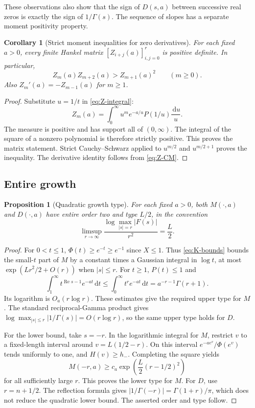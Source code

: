 \documentclass[11pt,a4paper]{article}
\numberwithin{equation}{section}
\newtheorem{proposition}[proposition]{Proposition}
\newtheorem{corollary}[corollary]{Corollary}
\theoremstyle{definition}
\theoremstyle{remark}
\newcommand{\dd}{\,\mathrm d}
\newcommand{\Rea}{\operatorname{Re}}
\newcommand{\abs}[1]{\left|#1\right|}
\begin{document}
These observations also show that the sign of $D(s,a)$ between
successive real zeros is exactly the sign of $1/\Gamma(s)$.
The sequence of slopes has a separate moment positivity property.

\begin{corollary}[Strict moment inequalities for zero derivatives]
\label{cor:Z-Hankel}
For each fixed $a>0$, every finite Hankel matrix
$[Z_{i+j}(a)]_{i,j=0}^{r}$ is positive definite. In particular,
\begin{equation}
 Z_m(a)Z_{m+2}(a)>Z_{m+1}(a)^2\qquad(m\ge0).
 \label{eq:Z-logconvex}
\end{equation}
Also $Z_m'(a)=-Z_{m-1}(a)$ for $m\ge1$.
\end{corollary}
\begin{proof}
Substitute $u=1/t$ in \cref{eq:Z-integral}:
\[
 Z_m(a)=\int_0^\infty u^m e^{-a/u}P(1/u)\frac{\dd u}{u}.
\]
The measure is positive and has support all of $(0,\infty)$.
The integral of the square of a nonzero polynomial is therefore
strictly positive. This proves the matrix statement. Strict
Cauchy--Schwarz applied to $u^{m/2}$ and $u^{m/2+1}$ proves the
inequality. The derivative identity follows from
\cref{eq:Z-CM}.
\end{proof}

\subsection{Entire growth}
\begin{proposition}[Quadratic growth type]
\label{prop:growth}
For each fixed $a>0$, both $M(\cdot,a)$ and $D(\cdot,a)$ have entire
order two and type $L/2$, in the convention
\[
 \limsup_{r\to\infty}\frac{\log\max_{\abs s=r}\abs{F(s)}}{r^2}
 =\frac L2.
\]
\end{proposition}
\begin{proof}
For $0<t\le1$, $\Phi(t)\ge e^{-t}\ge e^{-1}$ since $X\le1$.
Thus \cref{eq:K-bounds} bounds the small-$t$ part of $M$ by a
constant times a Gaussian integral in $\log t$, at most
$\exp(Lr^2/2+O(r))$ when $\abs s\le r$.
For $t\ge1$, $P(t)\le1$ and
\[
 \int_1^\infty t^{\Rea s-1}e^{-at}\dd t
 \le\int_0^\infty t^r e^{-at}\dd t
 =a^{-r-1}\Gamma(r+1).
\]
Its logarithm is $O_a(r\log r)$. These estimates give the required
upper type for $M$. The standard reciprocal-Gamma product gives
$\log\max_{\abs s\le r}\abs{1/\Gamma(s)}=O(r\log r)$, so the same
upper type holds for $D$.

For the lower bound, take $s=-r$. In the logarithmic integral for
$M$, restrict $v$ to a fixed-length interval around
$v=L(1/2-r)$. On this interval $e^{-ae^v}/\Phi(e^v)$ tends uniformly
to one, and $H(v)\ge h_-$. Completing the square yields
\[
 M(-r,a)\ge c_a\exp\left(\frac L2(r-1/2)^2\right)
\]
for all sufficiently large $r$. This proves the lower type for $M$.
For $D$, use $r=n+1/2$. The reflection formula gives
$\abs{1/\Gamma(-r)}=\Gamma(1+r)/\pi$, which does not reduce the
quadratic lower bound. The asserted order and type follow.
\end{proof}
\end{document}
